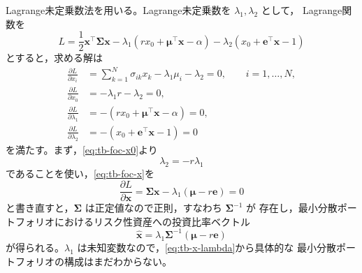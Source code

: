 Lagrange未定乗数法を用いる。Lagrange未定乗数を $\lambda_1,\lambda_2$ として，
Lagrange関数を
\begin{equation}
L = \frac{1}{2}\bm{x}^\top\bm{\Sigma}\bm{x}
- \lambda_1(r x_0 + \bm{\mu}^\top\bm{x} - \alpha)
- \lambda_2(x_0 + \bm{e}^\top\bm{x} - 1)
\end{equation}
とすると，求める解は
\begin{align}
\frac{\partial L}{\partial x_i}
&= \sum_{k=1}^{N}\sigma_{ik}x_k - \lambda_1\mu_i - \lambda_2 = 0,
\qquad i = 1,\dots,N,
\label{eq:tb-foc-x}\\
\frac{\partial L}{\partial x_0} &= -\lambda_1 r - \lambda_2 = 0,
\label{eq:tb-foc-x0}\\
\frac{\partial L}{\partial\lambda_1}
&= -(r x_0 + \bm{\mu}^\top\bm{x} - \alpha) = 0,
\label{eq:tb-c1}\\
\frac{\partial L}{\partial\lambda_2}
&= -(x_0 + \bm{e}^\top\bm{x} - 1) = 0
\label{eq:tb-c2}
\end{align}
を満たす。まず，\eqref{eq:tb-foc-x0}より
\begin{equation}
\lambda_2 = -r\lambda_1
\end{equation}
であることを使い，\eqref{eq:tb-foc-x}を
\begin{equation}
\frac{\partial L}{\partial\bm{x}}
= \bm{\Sigma}\bm{x} - \lambda_1(\bm{\mu} - r\bm{e}) = 0
\end{equation}
と書き直すと，$\bm{\Sigma}$ は正定値なので正則，すなわち $\bm{\Sigma}^{-1}$ が
存在し，最小分散ポートフォリオにおけるリスク性資産への投資比率ベクトル
\begin{equation}
\hat{\bm{x}} = \lambda_1\bm{\Sigma}^{-1}(\bm{\mu} - r\bm{e})
\label{eq:tb-x-lambda}
\end{equation}
が得られる。$\lambda_1$ は未知変数なので，\eqref{eq:tb-x-lambda}から具体的な
最小分散ポートフォリオの構成はまだわからない。

